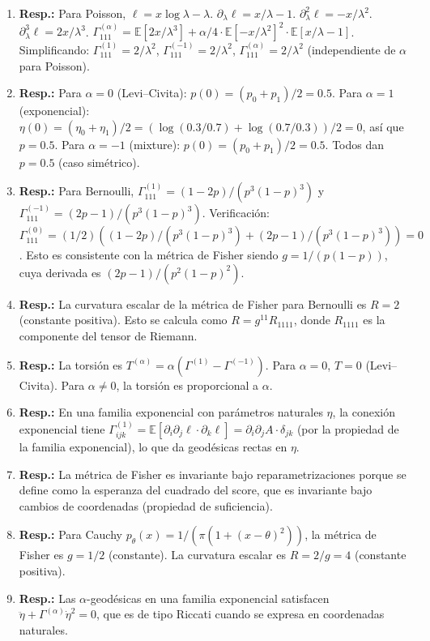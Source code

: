 \begin{enumerate}
	\item \textbf{Resp.:} Para Poisson, $\ell = x\log\lambda - \lambda$.  $\partial_\lambda \ell = x/\lambda - 1$.  $\partial_\lambda^2 \ell = -x/\lambda^2$.  $\partial_\lambda^3 \ell = 2x/\lambda^3$.  $\Gamma^{(\alpha)}_{111} = \mathbb{E}[2x/\lambda^3] + \alpha/4 \cdot \mathbb{E}[-x/\lambda^2]^2 \cdot \mathbb{E}[x/\lambda - 1]$.  Simplificando: $\Gamma^{(1)}_{111} = 2/\lambda^2$, $\Gamma^{(-1)}_{111} = 2/\lambda^2$, $\Gamma^{(\alpha)}_{111} = 2/\lambda^2$ (independiente de $\alpha$ para Poisson).
	\item \textbf{Resp.:} Para $\alpha=0$ (Levi--Civita): $p(0) = (p_0 + p_1)/2 = 0.5$.  Para $\alpha=1$ (exponencial): $\eta(0) = (\eta_0 + \eta_1)/2 = (\log(0.3/0.7) + \log(0.7/0.3))/2 = 0$, así que $p = 0.5$.  Para $\alpha=-1$ (mixture): $p(0) = (p_0 + p_1)/2 = 0.5$.  Todos dan $p = 0.5$ (caso simétrico).
	\item \textbf{Resp.:} Para Bernoulli, $\Gamma^{(1)}_{111} = (1-2p)/(p^3(1-p)^3)$ y $\Gamma^{(-1)}_{111} = (2p-1)/(p^3(1-p)^3)$.  Verificación: $\Gamma^{(0)}_{111} = (1/2)((1-2p)/(p^3(1-p)^3) + (2p-1)/(p^3(1-p)^3)) = 0$.  Esto es consistente con la métrica de Fisher siendo $g = 1/(p(1-p))$, cuya derivada es $(2p-1)/(p^2(1-p)^2)$.
	\item \textbf{Resp.:} La curvatura escalar de la métrica de Fisher para Bernoulli es $R = 2$ (constante positiva).  Esto se calcula como $R = g^{11} R_{1111}$, donde $R_{1111}$ es la componente del tensor de Riemann.
	\item \textbf{Resp.:} La torsión es $T^{(\alpha)} = \alpha(\Gamma^{(1)} - \Gamma^{(-1)})$.  Para $\alpha=0$, $T=0$ (Levi--Civita).  Para $\alpha \ne 0$, la torsión es proporcional a $\alpha$.
	\item \textbf{Resp.:} En una familia exponencial con parámetros naturales $\eta$, la conexión exponencial tiene $\Gamma^{(1)}_{ijk} = \mathbb{E}[\partial_i \partial_j \ell \cdot \partial_k \ell] = \partial_i \partial_j A \cdot \delta_{jk}$ (por la propiedad de la familia exponencial), lo que da geodésicas rectas en $\eta$.
	\item \textbf{Resp.:} La métrica de Fisher es invariante bajo reparametrizaciones porque se define como la esperanza del cuadrado del score, que es invariante bajo cambios de coordenadas (propiedad de suficiencia).
	\item \textbf{Resp.:} Para Cauchy $p_\theta(x) = 1/(\pi(1+(x-\theta)^2))$, la métrica de Fisher es $g = 1/2$ (constante).  La curvatura escalar es $R = 2/g = 4$ (constante positiva).
	\item \textbf{Resp.:} Las $\alpha$-geodésicas en una familia exponencial satisfacen $\ddot\eta + \Gamma^{(\alpha)} \dot\eta^2 = 0$, que es de tipo Riccati cuando se expresa en coordenadas naturales.
\end{enumerate}

